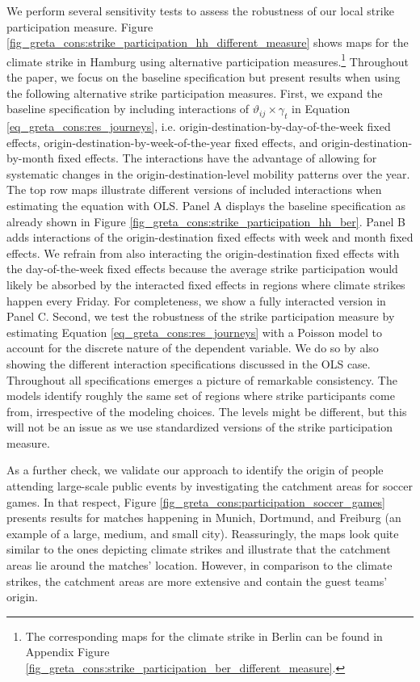 We perform several sensitivity tests to assess the robustness of our local strike participation measure. Figure \ref{fig_greta_cons:strike_participation_hh_different_measure} shows maps for the climate strike in Hamburg using alternative participation measures.\footnote{The corresponding maps for the climate strike in Berlin can be found in Appendix Figure \ref{fig_greta_cons:strike_participation_ber_different_measure}.} Throughout the paper, we focus on the baseline specification but present results when using the following alternative strike participation measures. First, we expand the baseline specification by including interactions of $\vartheta_{ij}\times\gamma_t$ in Equation \ref{eq_greta_cons:res_journeys}, i.e. origin-destination-by-day-of-the-week fixed effects, origin-destination-by-week-of-the-year fixed effects, and origin-destination-by-month fixed effects. The interactions have the advantage of allowing for systematic changes in the origin-destination-level mobility patterns over the year. The top row maps illustrate different versions of included interactions when estimating the equation with OLS. Panel A displays the baseline specification as already shown in Figure \ref{fig_greta_cons:strike_participation_hh_ber}. Panel B adds interactions of the origin-destination fixed effects with week and month fixed effects. We refrain from also interacting the origin-destination fixed effects with the day-of-the-week fixed effects because the average strike participation would likely be absorbed by the interacted fixed effects in regions where climate strikes happen every Friday. For completeness, we show a fully interacted version in Panel C. Second, we test the robustness of the strike participation measure by estimating Equation \ref{eq_greta_cons:res_journeys} with a Poisson model to account for the discrete nature of the dependent variable. We do so by also showing the different interaction specifications discussed in the OLS case. Throughout all specifications emerges a picture of remarkable consistency. The models identify roughly the same set of regions where strike participants come from, irrespective of the modeling choices. The levels might be different, but this will not be an issue as we use standardized versions of the strike participation measure.



As a further check, we validate our approach to identify the origin of people attending large-scale public events by investigating the catchment areas for soccer games. In that respect, Figure \ref{fig_greta_cons:participation_soccer_games} presents results for matches happening in Munich, Dortmund, and Freiburg (an example of a large, medium, and small city). Reassuringly, the maps look quite similar to the ones depicting climate strikes and illustrate that the catchment areas lie around the matches' location. However, in comparison to the climate strikes, the catchment areas are more extensive and contain the guest teams' origin.







